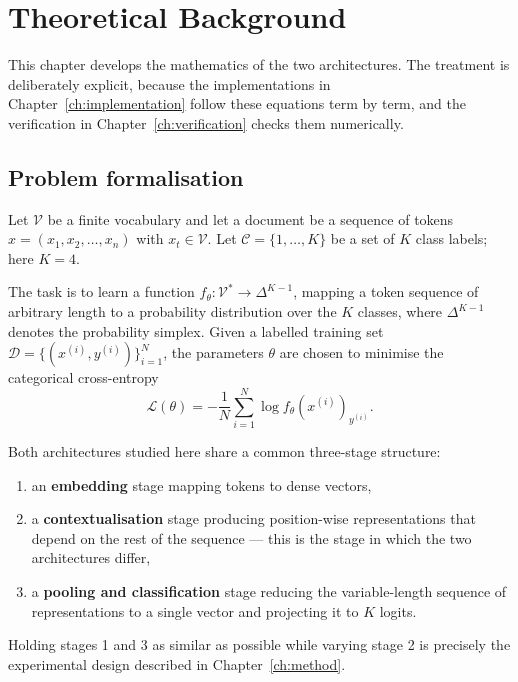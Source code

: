 \chapter{Theoretical Background}
\label{ch:theory}

This chapter develops the mathematics of the two architectures. The treatment is deliberately
explicit, because the implementations in Chapter~\ref{ch:implementation} follow these equations
term by term, and the verification in Chapter~\ref{ch:verification} checks them numerically.

\section{Problem formalisation}

Let $\mathcal{V}$ be a finite vocabulary and let a document be a sequence of tokens
$x = (x_1, x_2, \dots, x_n)$ with $x_t \in \mathcal{V}$. Let $\mathcal{C} = \{1, \dots, K\}$ be a
set of $K$ class labels; here $K = 4$.

The task is to learn a function $f_\theta : \mathcal{V}^{*} \rightarrow \Delta^{K-1}$, mapping a
token sequence of arbitrary length to a probability distribution over the $K$ classes, where
$\Delta^{K-1}$ denotes the probability simplex. Given a labelled training set
$\mathcal{D} = \{(x^{(i)}, y^{(i)})\}_{i=1}^{N}$, the parameters $\theta$ are chosen to minimise
the categorical cross-entropy
\begin{equation}
\mathcal{L}(\theta) = -\frac{1}{N} \sum_{i=1}^{N} \log f_\theta(x^{(i)})_{y^{(i)}} .
\label{eq:xent}
\end{equation}

Both architectures studied here share a common three-stage structure:
\begin{enumerate}
\item an \textbf{embedding} stage mapping tokens to dense vectors,
\item a \textbf{contextualisation} stage producing position-wise representations that depend on the
      rest of the sequence --- this is the stage in which the two architectures differ,
\item a \textbf{pooling and classification} stage reducing the variable-length sequence of
      representations to a single vector and projecting it to $K$ logits.
\end{enumerate}

Holding stages 1 and 3 as similar as possible while varying stage 2 is precisely the experimental
design described in Chapter~\ref{ch:method}.

